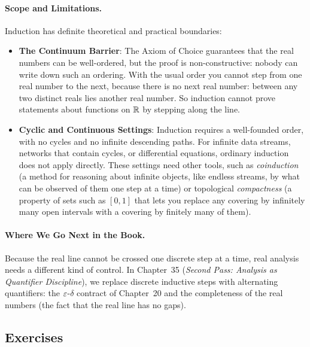 \paragraph{Scope and Limitations.}
Induction has definite theoretical and practical boundaries:
\begin{itemize}
  \item \textbf{The Continuum Barrier}: The Axiom of Choice guarantees that the real numbers can be well-ordered, but the proof is non-constructive: nobody can write down such an ordering. With the usual order you cannot step from one real number to the next, because there is no next real number: between any two distinct reals lies another real number. So induction cannot prove statements about functions on $\mathbb{R}$ by stepping along the line.
  \item \textbf{Cyclic and Continuous Settings}: Induction requires a well-founded order, with no cycles and no infinite descending paths. For infinite data streams, networks that contain cycles, or differential equations, ordinary induction does not apply directly. These settings need other tools, such as \emph{coinduction} (a method for reasoning about infinite objects, like endless streams, by what can be observed of them one step at a time) or topological \emph{compactness} (a property of sets such as $[0,1]$ that lets you replace any covering by infinitely many open intervals with a covering by finitely many of them).
\end{itemize}

\paragraph{Where We Go Next in the Book.}
Because the real line cannot be crossed one discrete step at a time, real analysis needs a different kind of control. In Chapter~35 (\emph{Second Pass: Analysis as Quantifier Discipline}), we replace discrete inductive steps with alternating quantifiers: the $\varepsilon$-$\delta$ contract of Chapter~20 and the completeness of the real numbers (the fact that the real line has no gaps).

\subsection{Exercises}

